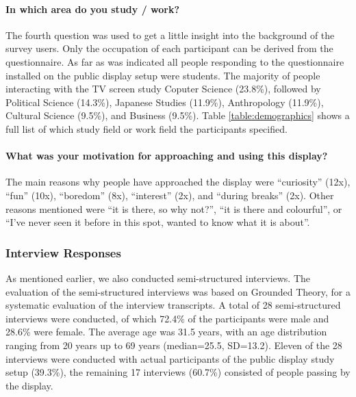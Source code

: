 	\paragraph{In which area do you study / work?}
	The fourth question was used to get a little insight into the background of the survey users. Only the occupation of each participant can be derived from the questionnaire. As far as was indicated all people responding to the questionnaire installed on the public display setup were students. The majority of people interacting with the TV screen study Coputer Science (23.8\%), followed by Political Science (14.3\%), Japanese Studies (11.9\%), Anthropology (11.9\%), Cultural Science (9.5\%), and Business (9.5\%). Table \ref{table:demographics} shows a full list of which study field or work field the participants specified.

	\paragraph{What was your motivation for approaching and using this display?}
	The main reasons why people have approached the display were ``curiosity'' (12x), ``fun'' (10x), ``boredom'' (8x), ``interest'' (2x), and ``during breaks'' (2x). Other reasons mentioned were ``it is there, so why not?'', ``it is there and colourful'', or ``I've never seen it before in this spot, wanted to know what it is about''.





	\subsubsection{Interview Responses}

	As mentioned earlier, we also conducted semi-structured interviews. The evaluation of the semi-structured interviews was based on Grounded Theory, for a systematic evaluation of the interview transcripts. A total of 28 semi-structured interviews were conducted, of which 72.4\% of the participants were male and 28.6\% were female. The average age was 31.5 years, with an age distribution ranging from 20 years up to 69 years (median=25.5, SD=13.2). Eleven of the 28 interviews were conducted with actual participants of the public display study setup (39.3\%), the remaining 17 interviews (60.7\%) consisted of people passing by the display. 

